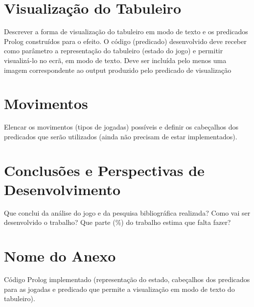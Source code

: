 \documentclass[a4paper]{article}
\begin{document}
\section{Visualização do Tabuleiro}
Descrever a forma de visualização do tabuleiro em modo de texto e os predicados Prolog construídos para o efeito. O código (predicado) desenvolvido deve receber como parâmetro a representação do tabuleiro (estado do jogo) e permitir visualizá-lo no ecrã, em modo de texto. Deve ser incluída pelo menos uma imagem correspondente ao output produzido pelo predicado de visualização

\section{Movimentos}
Elencar os movimentos (tipos de jogadas) possíveis e definir os cabeçalhos dos predicados que serão utilizados (ainda não precisam de estar implementados).

\section{Conclusões e Perspectivas de Desenvolvimento}
Que conclui da análise do jogo e da pesquisa bibliográfica realizada? Como vai ser desenvolvido o trabalho? Que parte (\%) do trabalho estima que falta fazer?
\clearpage
{}
\renewcommand\refname{Bibliografia}



\newpage
\appendix
\section{Nome do Anexo}
Código Prolog implementado (representação do estado, cabeçalhos dos predicados para as jogadas e predicado que permite a visualização em modo de texto do tabuleiro).
\end{document}
